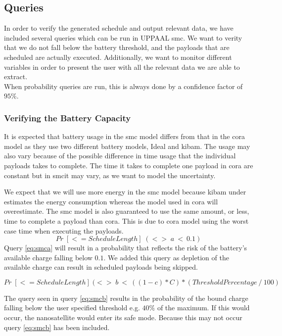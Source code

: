 \subsection{Queries}\label{sec:queries}
In order to verify the generated schedule and output relevant data, we have included several queries which can be run in UPPAAL \gls{smc}. We want to verity that we do not fall below the battery threshold, and the payloads that are scheduled are actually executed. Additionally, we want to monitor different variables in order to present the user with all the relevant data we are able to extract.\\
When probability queries are run, this is always done by a confidence factor of $95\%$.

\subsubsection*{Verifying the Battery Capacity}
It is expected that battery usage in the \gls{smc} model differs from that in the \gls{cora} model as they use two different battery models, Ideal and \gls{kibam}. The usage may also vary because of the possible difference in time usage that the individual payloads takes to complete. The time it takes to complete one payload in \gls{cora} are constant but in \gls{smc}it may vary, as we want to model the uncertainty.

We expect that we will use more energy in the \gls{smc} model because \gls{kibam} under estimates the energy consumption whereas the model used in \gls{cora} will overestimate. The \gls{smc} model is also guaranteed to use the same amount, or less, time to complete a payload than \gls{cora}. This is due to \gls{cora} model using the worst case time when executing the payloads.
\begin{equation} \label{eq:smca}
	Pr\; [<=ScheduleLength] \; (<>\; a\ <\ 0.1)
\end{equation}
Query \ref{eq:smca} will result in a probability that reflects the risk of the battery's available charge falling below $0.1$. We added this query as depletion of the available charge can result in scheduled payloads being skipped.

\begin{equation} \label{eq:smcb}
	Pr\; [<=ScheduleLength] \; (<>\; b\ <\ ((1-c)*C) * (ThresholdPercentage\ /\ 100)
\end{equation}

The query seen in query \ref{eq:smcb} results in the probability of the bound charge falling below the user specified threshold e.g. $40\%$ of the maximum. If this would occur, the nanosatellite would enter its safe mode. Because this may not occur query \ref{eq:smcb} has been included.

